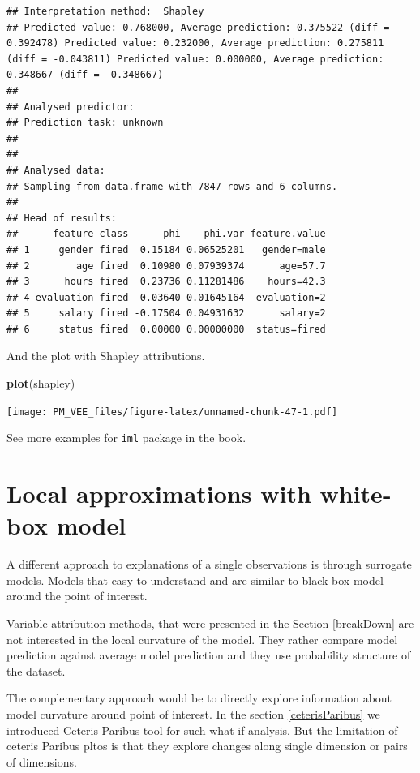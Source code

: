 \documentclass[]{krantz}
\newenvironment{Shaded}{\begin{snugshade}}{\end{snugshade}}
\newcommand{\KeywordTok}[1]{\textcolor[rgb]{0.13,0.29,0.53}{\textbf{#1}}}
\newcommand{\NormalTok}[1]{#1}
\theoremstyle{definition}
\theoremstyle{definition}
\theoremstyle{definition}
\theoremstyle{remark}
\begin{document}
\begin{verbatim}
## Interpretation method:  Shapley 
## Predicted value: 0.768000, Average prediction: 0.375522 (diff = 0.392478) Predicted value: 0.232000, Average prediction: 0.275811 (diff = -0.043811) Predicted value: 0.000000, Average prediction: 0.348667 (diff = -0.348667)
## 
## Analysed predictor: 
## Prediction task: unknown 
## 
## 
## Analysed data:
## Sampling from data.frame with 7847 rows and 6 columns.
## 
## Head of results:
##      feature class      phi    phi.var feature.value
## 1     gender fired  0.15184 0.06525201   gender=male
## 2        age fired  0.10980 0.07939374      age=57.7
## 3      hours fired  0.23736 0.11281486    hours=42.3
## 4 evaluation fired  0.03640 0.01645164  evaluation=2
## 5     salary fired -0.17504 0.04931632      salary=2
## 6     status fired  0.00000 0.00000000  status=fired
\end{verbatim}

And the plot with Shapley attributions.

\begin{Shaded}
\begin{Highlighting}[]
\KeywordTok{plot}\NormalTok{(shapley)}
\end{Highlighting}
\end{Shaded}

\texttt{[image: PM\_VEE\_files/figure-latex/unnamed-chunk-47-1.pdf]}

See more examples for \texttt{iml} package in the \citep{molnar} book.

\hypertarget{LIME}{%
\section{Local approximations with white-box model}\label{LIME}}

A different approach to explanations of a single observations is through
surrogate models. Models that easy to understand and are similar to
black box model around the point of interest.

Variable attribution methods, that were presented in the Section
\ref{breakDown} are not interested in the local curvature of the model.
They rather compare model prediction against average model prediction
and they use probability structure of the dataset.

The complementary approach would be to directly explore information
about model curvature around point of interest. In the section
\ref{ceterisParibus} we introduced Ceteris Paribus tool for such what-if
analysis. But the limitation of ceteris Paribus pltos is that they
explore changes along single dimension or pairs of dimensions.
\end{document}
